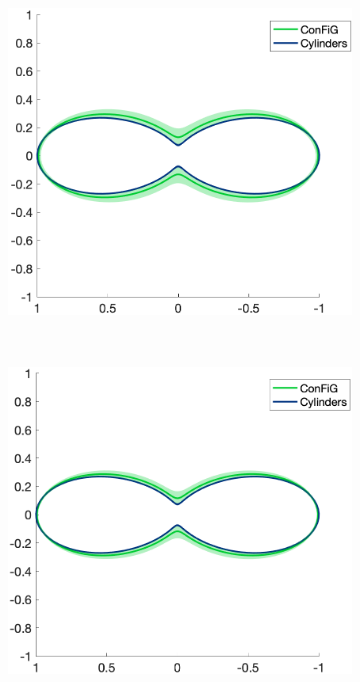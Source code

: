 \begin{figure}
  \centering
  \begin{subfigure}[]{0.32\textwidth}
    \includegraphics[width=\textwidth]{figures/frf_experiment/fibres_prctiles_kappa_2_b_2000.png}
    \caption{}
  \end{subfigure}
  ~
  \begin{subfigure}[]{0.32\textwidth}
    \includegraphics[width=\textwidth]{figures/frf_experiment/fibres_prctiles_kappa_6_b_2000.png}

\end{subfigure}
\end{figure}

